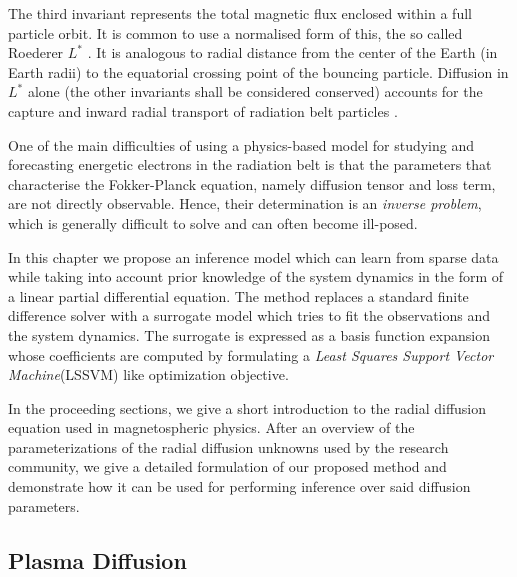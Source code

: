 The third invariant represents the total magnetic flux enclosed within a full particle orbit. It is 
common to use a normalised form of this, the so called Roederer $L^{*}$ \citep{Roederer1970}. It is 
analogous to radial distance from the center of the Earth (in Earth radii) to the equatorial 
crossing point of the bouncing particle. Diffusion in $L^{*}$ alone (the other invariants shall be 
considered conserved) accounts for the capture and inward radial transport of radiation belt 
particles \citep{Roederer1970,JGR:JGR4463}.

One of the main difficulties of using a physics-based model for studying and forecasting energetic 
electrons in the radiation belt is that the parameters that characterise the Fokker-Planck 
equation, namely diffusion tensor and loss term, are not directly observable. Hence, their 
determination is an \emph{inverse problem}, which is generally difficult to solve and can often 
become ill-posed.

In this chapter we propose an inference model which can learn from sparse data while taking into 
account prior knowledge of the system dynamics in the form of a linear partial differential 
equation. The method replaces a standard finite difference solver with a surrogate model which 
tries to fit the observations and the system dynamics. The surrogate is expressed as a basis 
function expansion whose coefficients are computed by formulating a 
\emph{Least Squares Support Vector Machine}(LSSVM) like optimization objective.

In the proceeding sections, we give a short introduction to the radial diffusion equation used in 
magnetospheric physics. After an overview of the parameterizations of the radial diffusion unknowns 
used by the research community, we give a detailed formulation of our proposed method and 
demonstrate how it can be used for performing inference over said diffusion parameters.

\subsection{Plasma Diffusion}

